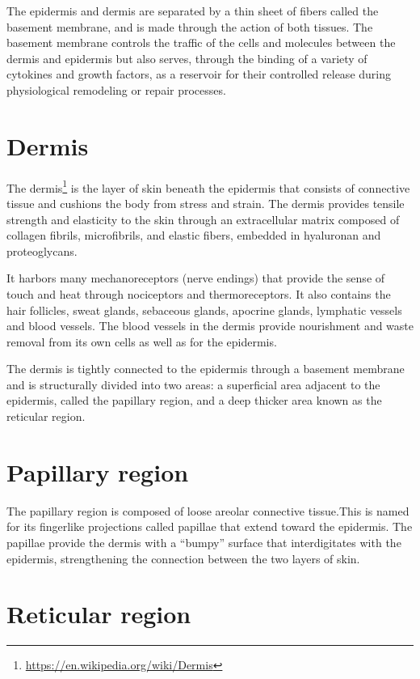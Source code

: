 \documentclass[]{book}
\let\rmarkdownfootnote\footnote%
\def\footnote{\protect\rmarkdownfootnote}
\renewcommand{\href}[2]{#2\footnote{\url{#1}}}
\begin{document}
The epidermis and dermis are separated by a thin sheet of fibers called the basement membrane, and is made through the action of both tissues. The basement membrane controls the traffic of the cells and molecules between the dermis and epidermis but also serves, through the binding of a variety of cytokines and growth factors, as a reservoir for their controlled release during physiological remodeling or repair processes.

\hypertarget{dermis}{%
\section{Dermis}\label{dermis}}

The \href{https://en.wikipedia.org/wiki/Dermis}{dermis} is the layer of skin beneath the epidermis that consists of connective tissue and cushions the body from stress and strain. The dermis provides tensile strength and elasticity to the skin through an extracellular matrix composed of collagen fibrils, microfibrils, and elastic fibers, embedded in hyaluronan and proteoglycans.

It harbors many mechanoreceptors (nerve endings) that provide the sense of touch and heat through nociceptors and thermoreceptors. It also contains the hair follicles, sweat glands, sebaceous glands, apocrine glands, lymphatic vessels and blood vessels. The blood vessels in the dermis provide nourishment and waste removal from its own cells as well as for the epidermis.

The dermis is tightly connected to the epidermis through a basement membrane and is structurally divided into two areas: a superficial area adjacent to the epidermis, called the papillary region, and a deep thicker area known as the reticular region.

\hypertarget{papillary-region}{%
\section{Papillary region}\label{papillary-region}}

The papillary region is composed of loose areolar connective tissue.This is named for its fingerlike projections called papillae that extend toward the epidermis. The papillae provide the dermis with a ``bumpy'' surface that interdigitates with the epidermis, strengthening the connection between the two layers of skin.

\hypertarget{reticular-region}{%
\section{Reticular region}\label{reticular-region}}
\end{document}
